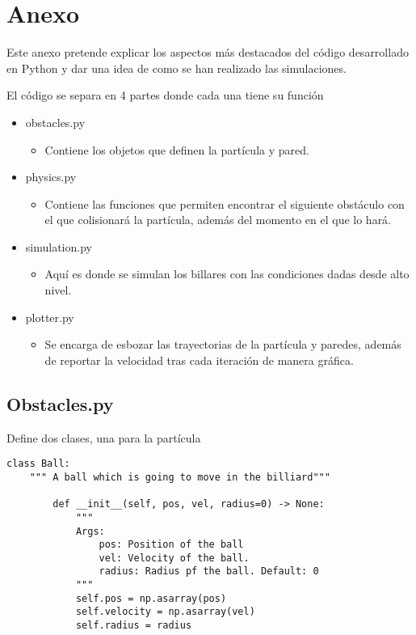 \chapter*{Anexo}

Este anexo pretende explicar los aspectos más destacados del código desarrollado en Python y dar una idea de como se han realizado las simulaciones.

\vspace{3mm}

El código se separa en 4 partes donde cada una tiene su función

\begin{itemize}
    \item obstacles.py
    \begin{itemize}
        \item Contiene los objetos que definen la partícula y pared.
    \end{itemize}
    \item physics.py
    \begin{itemize}
        \item Contiene las funciones que permiten encontrar el siguiente obstáculo con el que colisionará la partícula, además del momento en el que lo hará.
    \end{itemize}
    \item simulation.py
    \begin{itemize}
        \item Aquí es donde se simulan los billares con las condiciones dadas desde alto nivel. 
    \end{itemize}
    \item plotter.py
    \begin{itemize}
        \item Se encarga de esbozar las trayectorias de la partícula y paredes, además de reportar la velocidad tras cada iteración de manera gráfica.
    \end{itemize}
\end{itemize}

\section*{Obstacles.py}

Define dos clases, una para la partícula 

\begin{lstlisting}[breaklines]
    class Ball:
    """ A ball which is going to move in the billiard"""

        def __init__(self, pos, vel, radius=0) -> None:
            """
            Args:
                pos: Position of the ball
                vel: Velocity of the ball.
                radius: Radius pf the ball. Default: 0
            """
            self.pos = np.asarray(pos)
            self.velocity = np.asarray(vel)
            self.radius = radius
\end{lstlisting}

